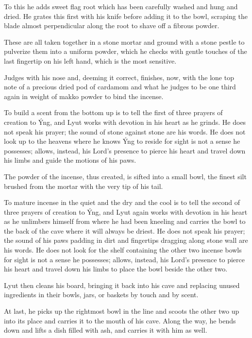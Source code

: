 To this he adds sweet flag root which has been carefully washed and hung and dried. He grates this first with his knife before adding it to the bowl, scraping the blade almost perpendicular along the root to shave off a fibrous powder.

These are all taken together in a stone mortar and ground with a stone pestle to pulverize them into a uniform powder, which he checks with gentle touches of the last fingertip on his left hand, which is the most sensitive.

Judges with his nose and, deeming it correct, finishes, now, with the lone top note of a precious dried pod of cardamom and what he judges to be one third again in weight of makko powder to bind the incense.

To build a scent from the bottom up is to tell the first of three prayers of creation to Ýng, and Lyut works with devotion in his heart as he grinds. He does not speak his prayer; the sound of stone against stone are his words. He does not look up to the heavens where he knows Ýng to reside for sight is not a sense he possesses; allows, instead, his Lord's presence to pierce his heart and travel down his limbs and guide the motions of his paws.

The powder of the incense, thus created, is sifted into a small bowl, the finest silt brushed from the mortar with the very tip of his tail.

To mature incense in the quiet and the dry and the cool is to tell the second of three prayers of creation to Ýng, and Lyut again works with devotion in his heart as he unlimbers himself from where he had been kneeling and carries the bowl to the back of the cave where it will always be driest. He does not speak his prayer; the sound of his paws padding in dirt and fingertips dragging along stone wall are his words. He does not look for the shelf containing the other two incense bowls for sight is not a sense he possesses; allows, instead, his Lord's presence to pierce his heart and travel down his limbs to place the bowl beside the other two.

Lyut then cleans his board, bringing it back into his cave and replacing unused ingredients in their bowls, jars, or baskets by touch and by scent.

At last, he picks up the rightmost bowl in the line and scoots the other two up into its place and carries it to the mouth of his cave. Along the way, he bends down and lifts a dish filled with ash, and carries it with him as well.

